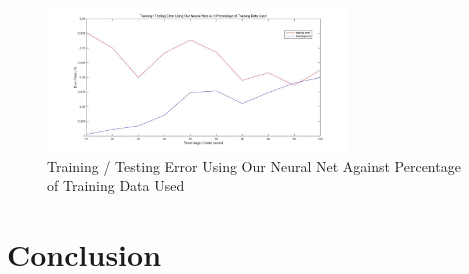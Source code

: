 \documentclass[10pt,twocolumn]{article}
\begin{document}
\begin{figure}

\includegraphics[width = 8cm]{figure/neural_net_percentage_data}
\caption{Training / Testing Error Using Our Neural Net Against Percentage of Training Data Used}
\label{fig:neural_net_percentage_data}
\end{figure}

\FloatBarrier

\section{Conclusion} \label{sec:conclude}


{}

\end{document}
